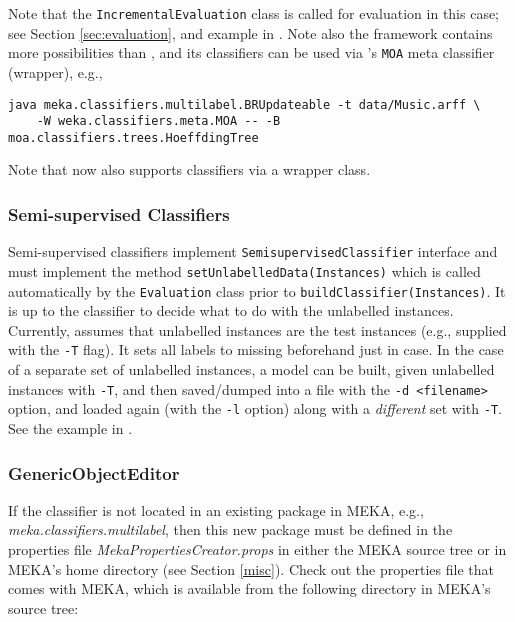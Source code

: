 \documentclass[11pt]{article}
\newcommand{\MEKA}{Meka}
\newcommand{\MOA}{Moa}
\newcommand{\WEKA}{Weka}
\begin{document}
Note that the \texttt{IncrementalEvaluation} class is called for evaluation in this case; see Section \ref{sec:evaluation}, and example in . Note also the \framework{\MOA} framework \cite{MOA} contains more possibilities than \framework{\WEKA}, and its classifiers can be used via 's \texttt{MOA} meta classifier (wrapper), e.g., 
\begin{lstlisting}
java meka.classifiers.multilabel.BRUpdateable -t data/Music.arff \
	-W weka.classifiers.meta.MOA -- -B moa.classifiers.trees.HoeffdingTree
\end{lstlisting}

Note that \framework{\MOA} now also supports \framework{\MEKA} classifiers via a wrapper class.

\subsubsection{Semi-supervised Classifiers}

Semi-supervised classifiers implement \texttt{SemisupervisedClassifier} interface and must implement the method \texttt{setUnlabelledData(Instances)} which is called automatically by the \texttt{Evaluation} class prior to \texttt{buildClassifier(Instances)}. It is up to the classifier to decide what to do with the unlabelled instances. Currently, \framework{\MEKA} assumes that unlabelled instances are the test instances (e.g., supplied with the \texttt{-T} flag). It sets all labels to missing beforehand just in case. In the case of a separate set of unlabelled instances, a model can be built, given unlabelled instances with \texttt{-T}, and then saved/dumped into a file with the \texttt{-d <filename>} option, and loaded again (with the \texttt{-l} option) along with a \emph{different} set with \texttt{-T}.  See the example in .


\subsubsection{GenericObjectEditor}
\label{goe}
If the classifier is not located in an existing package in MEKA, e.g., \textit{meka.classifiers.multilabel},
then this new package must be defined in the properties file \textit{MekaPropertiesCreator.props}
in either the MEKA source tree or in MEKA's home directory (see Section \ref{misc}).
Check out the properties file that comes with MEKA, which is available from the
following directory in MEKA's source tree:
\end{document}
